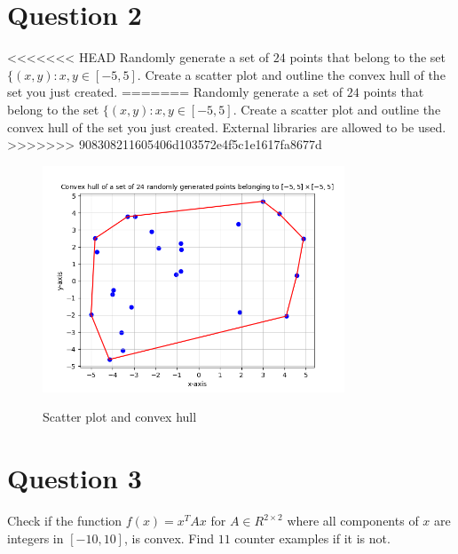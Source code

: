 \documentclass{article}
\begin{document}
\begin{flushleft}
\section{Question 2}
<<<<<<< HEAD
Randomly generate a set of $24$ points that belong to the set $\{(x,y):x,y\in[-5,5]$. Create a scatter plot and outline the convex hull of the set you just created.
=======
Randomly generate a set of $24$ points that belong to the set $\{(x,y):x,y\in[-5,5]$. Create a scatter plot and outline the convex hull of the set you just created. External libraries are allowed to be used.
>>>>>>> 908308211605406d103572e4f5c1e1617fa8677d
\begin{figure}[htp]
        \centering
        \includegraphics[width=9cm]{conv_hull.png}\\
        \caption{Scatter plot and convex hull}
\end{figure}
\section{Question 3}
Check if the function $f(x)=x^{T}Ax$ for $A\in R^{2\times2}$ where all components of $x$ are integers in $[-10,10]$, is convex. Find $11$ counter examples if it is not.\\~\\


\end{flushleft}
\end{document}
